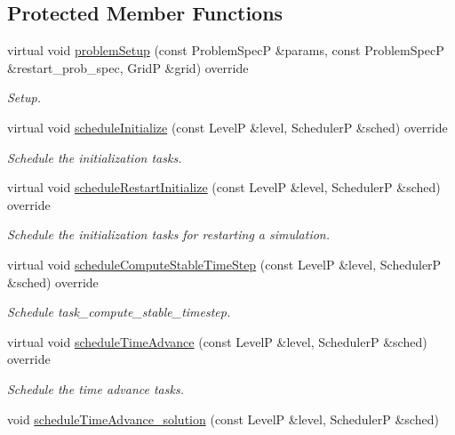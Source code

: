 \subsection*{Protected Member Functions}
\begin{DoxyCompactItemize}
\item 
virtual void \hyperlink{classUintah_1_1PhaseField_1_1Benchmark01_a426541ce929d26d0f0d9712d25da666b}{problem\+Setup} (const Problem\+SpecP \&params, const Problem\+SpecP \&restart\+\_\+prob\+\_\+spec, GridP \&grid) override
\begin{DoxyCompactList}\small\item\em Setup. \end{DoxyCompactList}\item 
virtual void \hyperlink{classUintah_1_1PhaseField_1_1Benchmark01_adaa55a328a231404f070cc9730764852}{schedule\+Initialize} (const LevelP \&level, SchedulerP \&sched) override
\begin{DoxyCompactList}\small\item\em Schedule the initialization tasks. \end{DoxyCompactList}\item 
virtual void \hyperlink{classUintah_1_1PhaseField_1_1Benchmark01_aefae5ede638d77a117caea0decd060e5}{schedule\+Restart\+Initialize} (const LevelP \&level, SchedulerP \&sched) override
\begin{DoxyCompactList}\small\item\em Schedule the initialization tasks for restarting a simulation. \end{DoxyCompactList}\item 
virtual void \hyperlink{classUintah_1_1PhaseField_1_1Benchmark01_a12d0aab623f6edcb1eedb9bf48b89d43}{schedule\+Compute\+Stable\+Time\+Step} (const LevelP \&level, SchedulerP \&sched) override
\begin{DoxyCompactList}\small\item\em Schedule task\+\_\+compute\+\_\+stable\+\_\+timestep. \end{DoxyCompactList}\item 
virtual void \hyperlink{classUintah_1_1PhaseField_1_1Benchmark01_a0b0fa031276034614fca1d38d0790934}{schedule\+Time\+Advance} (const LevelP \&level, SchedulerP \&sched) override
\begin{DoxyCompactList}\small\item\em Schedule the time advance tasks. \end{DoxyCompactList}\item 
void \hyperlink{classUintah_1_1PhaseField_1_1Benchmark01_a2cf1fec2489115edcb7935be78a79e2a}{schedule\+Time\+Advance\+\_\+solution} (const LevelP \&level, SchedulerP \&sched)

\end{DoxyCompactItemize}
